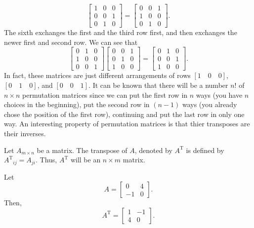 \documentclass[11pt]{article}
\theoremstyle{break}
\theoremstyle{no_label}
\newcommand{\transpose}{\text{T}}
\numberwithin{equation}{section}
\begin{document}
$$\begin{bmatrix}
    1 & 0 & 0\\
    0 & 0 & 1\\
    0 & 1 & 0
\end{bmatrix}=\begin{bmatrix}
    0 & 0 & 1\\
    1 & 0 & 0\\
    0 & 1 & 0
\end{bmatrix}.$$ The sixth exchanges the first and the third row first, and then exchanges the newer first and second row. We can see that $$\begin{bmatrix}
    0 & 1 & 0\\
    1 & 0 & 0\\
    0 & 0 & 1
\end{bmatrix}\begin{bmatrix}
    0 & 0 & 1\\
    0 & 1 & 0\\
    1 & 0 & 0
\end{bmatrix}=\begin{bmatrix}
    0 & 1 & 0\\
    0 & 0 & 1\\
    1 & 0 & 0
\end{bmatrix}.$$ In fact, these matrices are just different arrangements of rows $[1\quad 0\quad 0]$, $[0\quad 1\quad 0]$, and $[0\quad 0\quad 1]$. It can be known that there will be a number $n!$ of $n\times n$ permutation matrices since we can put the first row in $n$ ways (you have $n$ choices in the beginning), put the second row in $(n-1)$ ways (you already chose the position of the first row), continuing and put the last row in only one way. An interesting property of permutation matrices is that thier transposes are their inverses.

\begin{definition}[Transpose]
    Let $A_{m\times n}$ be a matrix. The transpose of $A$, denoted by $A^\transpose$ is defined by ${A^\transpose}_{ij}=A_{ji}.$ Thus, $A^\transpose$ will be an $n\times m$ matrix.
\end{definition}

\begin{example}
    Let $$A=\begin{bmatrix}
        0 & 4\\
        -1 & 0
    \end{bmatrix}.$$ Then, $$A^\transpose=\begin{bmatrix}
        1 & -1\\
        4 & 0
    \end{bmatrix}.$$
\end{example}
\end{document}
